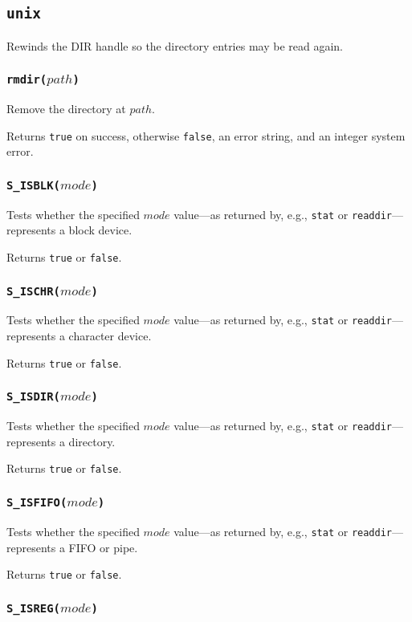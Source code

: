 \documentclass[11pt, oneside]{memoir}
\newcommand*{\true}[0]{\texttt{true}\xspace}
\newcommand*{\false}[0]{\texttt{false}\xspace}
\newcommand*{\syscall}[1]{\texttt{#1}\xspace}
\newcommand*{\fn}[1]{\texttt{#1}\xspace}
\newcounter{toccols}
\newenvironment{Module}[1]{
	\subsection{\texttt{#1}}
	\addtocontents{toc}{
		\protect\begin{multicols}{\value{toccols}}
	}
}{
	\addtocontents{toc}{\protect\end{multicols}}
}
\begin{document}
\begin{Module}{unix}
Rewinds the DIR handle so the directory entries may be read again.

\subsubsection[\fn{rmdir}]{\fn{rmdir($path$)}}

Remove the directory at $path$.

Returns \true on success, otherwise \false, an error string, and an integer system error.

\subsubsection[\fn{S\_ISBLK}]{\fn{S\_ISBLK($mode$)}}

Tests whether the specified $mode$ value---as returned by, e.g., \syscall{stat} or \syscall{readdir}---represents a block device.

Returns \true or \false.

\subsubsection[\fn{S\_ISCHR}]{\fn{S\_ISCHR($mode$)}}

Tests whether the specified $mode$ value---as returned by, e.g., \syscall{stat} or \syscall{readdir}---represents a character device.

Returns \true or \false.

\subsubsection[\fn{S\_ISDIR}]{\fn{S\_ISDIR($mode$)}}

Tests whether the specified $mode$ value---as returned by, e.g., \syscall{stat} or \syscall{readdir}---represents a directory.

Returns \true or \false.

\subsubsection[\fn{S\_ISFIFO}]{\fn{S\_ISFIFO($mode$)}}

Tests whether the specified $mode$ value---as returned by, e.g., \syscall{stat} or \syscall{readdir}---represents a FIFO or pipe.

Returns \true or \false.

\subsubsection[\fn{S\_ISREG}]{\fn{S\_ISREG($mode$)}}


\end{Module}
\end{document}
